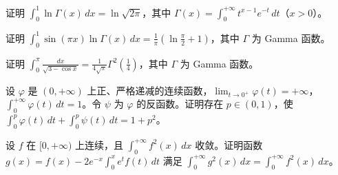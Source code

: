 \noindent\begin{minipage}{\textwidth}
证明 $\displaystyle\int_0^1\ln\Gamma(x)\,dx=\ln\sqrt{2\pi}$，其中 $\displaystyle\Gamma(x)=\int_0^{+\infty}t^{x-1}e^{-t}\,dt$（$x>0$）。
\end{minipage}\par\vfill
\noindent\begin{minipage}{\textwidth}
证明 $\displaystyle\int_0^1\sin(\pi x)\ln\Gamma(x)\,dx=\frac1\pi\left(\ln\frac\pi2+1\right)$，其中 $\Gamma$ 为 Gamma 函数。
\end{minipage}\par\vfill
\newpage
\noindent\begin{minipage}{\textwidth}
证明 $\displaystyle\int_0^\pi\frac{dx}{\sqrt{3-\cos x}}=\frac1{4\sqrt\pi}\Gamma^2\!\left(\frac14\right)$，其中 $\Gamma$ 为 Gamma 函数。
\end{minipage}\par\vfill
\noindent\begin{minipage}{\textwidth}
设 $\varphi$ 是 $(0,+\infty)$ 上正、严格递减的连续函数，$\displaystyle\lim_{t\to0^+}\varphi(t)=+\infty$，$\displaystyle\int_0^{+\infty}\varphi(t)\,dt=1$。令 $\psi$ 为 $\varphi$ 的反函数。证明存在 $p\in(0,1)$，使 $\displaystyle\int_0^p\varphi(t)\,dt+\int_0^p\psi(t)\,dt=1+p^2$。
\end{minipage}\par\vfill
\noindent\begin{minipage}{\textwidth}
设 $f$ 在 $[0,+\infty)$ 上连续，且 $\displaystyle\int_0^{+\infty}f^2(x)\,dx$ 收敛。证明函数 $\displaystyle g(x)=f(x)-2e^{-x}\int_0^xe^tf(t)\,dt$ 满足 $\displaystyle\int_0^{+\infty}g^2(x)\,dx=\int_0^{+\infty}f^2(x)\,dx$。
\end{minipage}\par\vfill
